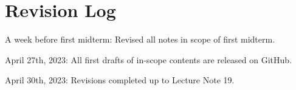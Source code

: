 \chapter{Revision Log}

\begin{bindenum}
    \item A week before first midterm: Revised all notes in scope of first midterm.
    \item April 27th, 2023: All first drafts of in-scope contents are released on GitHub.
    \item April 30th, 2023: Revisions completed up to Lecture Note 19.
\end{bindenum}
